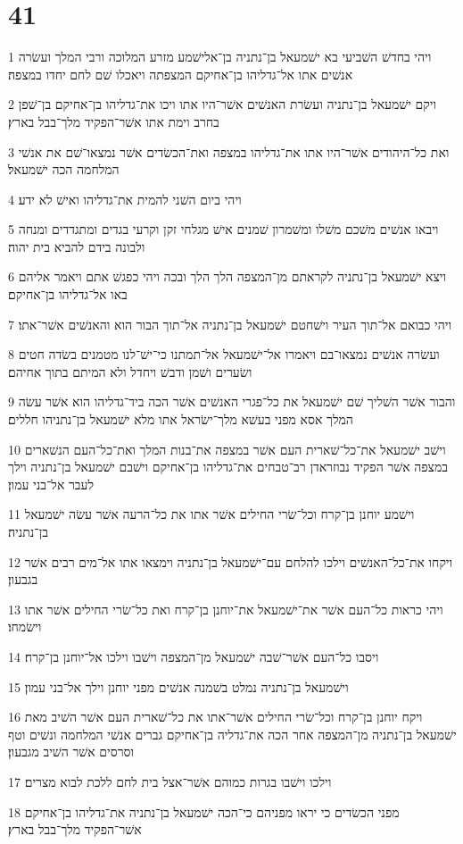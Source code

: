 \chapter{41}

\par 1 ויהי בחדשׁ השׁביעי בא ישׁמעאל בן־נתניה בן־אלישׁמע מזרע המלוכה ורבי המלך ועשׂרה אנשׁים אתו אל־גדליהו בן־אחיקם המצפתה ויאכלו שׁם לחם יחדו במצפה׃
\par 2 ויקם ישׁמעאל בן־נתניה ועשׂרת האנשׁים אשׁר־היו אתו ויכו את־גדליהו בן־אחיקם בן־שׁפן בחרב וימת אתו אשׁר־הפקיד מלך־בבל בארץ׃
\par 3 ואת כל־היהודים אשׁר־היו אתו את־גדליהו במצפה ואת־הכשׂדים אשׁר נמצאו־שׁם את אנשׁי המלחמה הכה ישׁמעאל׃
\par 4 ויהי ביום השׁני להמית את־גדליהו ואישׁ לא ידע׃
\par 5 ויבאו אנשׁים משׁכם משׁלו ומשׁמרון שׁמנים אישׁ מגלחי זקן וקרעי בגדים ומתגדדים ומנחה ולבונה בידם להביא בית יהוה׃
\par 6 ויצא ישׁמעאל בן־נתניה לקראתם מן־המצפה הלך הלך ובכה ויהי כפגשׁ אתם ויאמר אליהם באו אל־גדליהו בן־אחיקם׃
\par 7 ויהי כבואם אל־תוך העיר וישׁחטם ישׁמעאל בן־נתניה אל־תוך הבור הוא והאנשׁים אשׁר־אתו׃
\par 8 ועשׂרה אנשׁים נמצאו־בם ויאמרו אל־ישׁמעאל אל־תמתנו כי־ישׁ־לנו מטמנים בשׂדה חטים ושׂערים ושׁמן ודבשׁ ויחדל ולא המיתם בתוך אחיהם׃
\par 9 והבור אשׁר השׁליך שׁם ישׁמעאל את כל־פגרי האנשׁים אשׁר הכה ביד־גדליהו הוא אשׁר עשׂה המלך אסא מפני בעשׁא מלך־ישׂראל אתו מלא ישׁמעאל בן־נתניהו חללים׃
\par 10 וישׁב ישׁמעאל את־כל־שׁארית העם אשׁר במצפה את־בנות המלך ואת־כל־העם הנשׁארים במצפה אשׁר הפקיד נבוזראדן רב־טבחים את־גדליהו בן־אחיקם וישׁבם ישׁמעאל בן־נתניה וילך לעבר אל־בני עמון׃
\par 11 וישׁמע יוחנן בן־קרח וכל־שׂרי החילים אשׁר אתו את כל־הרעה אשׁר עשׂה ישׁמעאל בן־נתניה׃
\par 12 ויקחו את־כל־האנשׁים וילכו להלחם עם־ישׁמעאל בן־נתניה וימצאו אתו אל־מים רבים אשׁר בגבעון׃
\par 13 ויהי כראות כל־העם אשׁר את־ישׁמעאל את־יוחנן בן־קרח ואת כל־שׂרי החילים אשׁר אתו וישׂמחו׃
\par 14 ויסבו כל־העם אשׁר־שׁבה ישׁמעאל מן־המצפה וישׁבו וילכו אל־יוחנן בן־קרח׃
\par 15 וישׁמעאל בן־נתניה נמלט בשׁמנה אנשׁים מפני יוחנן וילך אל־בני עמון׃
\par 16 ויקח יוחנן בן־קרח וכל־שׂרי החילים אשׁר־אתו את כל־שׁארית העם אשׁר השׁיב מאת ישׁמעאל בן־נתניה מן־המצפה אחר הכה את־גדליה בן־אחיקם גברים אנשׁי המלחמה ונשׁים וטף וסרסים אשׁר השׁיב מגבעון׃
\par 17 וילכו וישׁבו בגרות כמוהם אשׁר־אצל בית לחם ללכת לבוא מצרים׃
\par 18 מפני הכשׂדים כי יראו מפניהם כי־הכה ישׁמעאל בן־נתניה את־גדליהו בן־אחיקם אשׁר־הפקיד מלך־בבל בארץ׃

